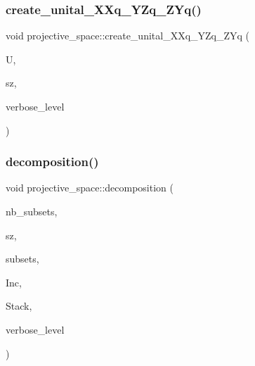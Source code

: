 \subsubsection{\texorpdfstring{create\+\_\+unital\+\_\+\+X\+Xq\+\_\+\+Y\+Zq\+\_\+\+Z\+Yq()}{create\_unital\_XXq\_YZq\_ZYq()}}
{\footnotesize\ttfamily void projective\+\_\+space\+::create\+\_\+unital\+\_\+\+X\+Xq\+\_\+\+Y\+Zq\+\_\+\+Z\+Yq (\begin{DoxyParamCaption}\item[{\mbox{\hyperlink{galois_8h_a09fddde158a3a20bd2dcadb609de11dc}{I\+NT}} $\ast$}]{U,  }\item[{\mbox{\hyperlink{galois_8h_a09fddde158a3a20bd2dcadb609de11dc}{I\+NT}} \&}]{sz,  }\item[{\mbox{\hyperlink{galois_8h_a09fddde158a3a20bd2dcadb609de11dc}{I\+NT}}}]{verbose\+\_\+level }\end{DoxyParamCaption})}

\mbox{\label{classprojective__space_ae060ee525e7a974bce04d78be7f6dd51}} 
\subsubsection{\texorpdfstring{decomposition()}{decomposition()}}
{\footnotesize\ttfamily void projective\+\_\+space\+::decomposition (\begin{DoxyParamCaption}\item[{\mbox{\hyperlink{galois_8h_a09fddde158a3a20bd2dcadb609de11dc}{I\+NT}}}]{nb\+\_\+subsets,  }\item[{\mbox{\hyperlink{galois_8h_a09fddde158a3a20bd2dcadb609de11dc}{I\+NT}} $\ast$}]{sz,  }\item[{\mbox{\hyperlink{galois_8h_a09fddde158a3a20bd2dcadb609de11dc}{I\+NT}} $\ast$$\ast$}]{subsets,  }\item[{\mbox{\hyperlink{classincidence__structure}{incidence\+\_\+structure}} $\ast$\&}]{Inc,  }\item[{\mbox{\hyperlink{classpartitionstack}{partitionstack}} $\ast$\&}]{Stack,  }\item[{\mbox{\hyperlink{galois_8h_a09fddde158a3a20bd2dcadb609de11dc}{I\+NT}}}]{verbose\+\_\+level }\end{DoxyParamCaption})}

\mbox{\label{classprojective__space_ad37dfe343cac13cc6c90e1fabf77ce14}} 
